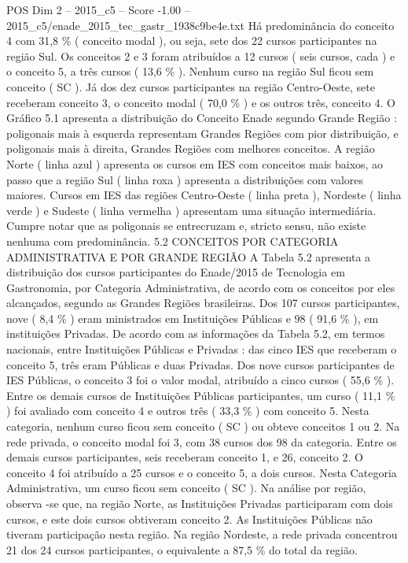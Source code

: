 \begin{textsample}{POS Dim 2 – 2015\_c5 – Score -1.00 – 2015\_c5/enade\_2015\_tec\_gastr\_1938c9be4e.txt}
Há predominância do conceito 4 com 31,8 \% ( conceito modal ), ou seja, sete dos 22 cursos participantes na região Sul.
Os conceitos 2 e 3 foram atribuídos a 12 cursos ( seis cursos, cada ) e o conceito 5, a três cursos ( 13,6 \% ).
Nenhum curso na região Sul ficou sem conceito ( SC ).
Já dos dez cursos participantes na região Centro-Oeste, sete receberam conceito 3, o conceito modal ( 70,0 \% ) e os outros três, conceito 4.
O Gráfico 5.1 apresenta a distribuição do Conceito Enade segundo Grande Região : poligonais mais à esquerda representam Grandes Regiões com pior distribuição, e poligonais mais à direita, Grandes Regiões com melhores conceitos.
A região Norte ( linha azul ) apresenta os cursos em IES com conceitos mais baixos, ao passo que a região Sul ( linha roxa ) apresenta a distribuições com valores maiores.
Cursos em IES das regiões Centro-Oeste ( linha preta ), Nordeste ( linha verde ) e Sudeste ( linha vermelha ) apresentam uma situação intermediária.
Cumpre notar que as poligonais se entrecruzam e, stricto sensu, não existe nenhuma com predominância. 5.2 CONCEITOS POR CATEGORIA ADMINISTRATIVA E POR GRANDE REGIÃO A Tabela 5.2 apresenta a distribuição dos cursos participantes do Enade/2015 de Tecnologia em Gastronomia, por Categoria Administrativa, de acordo com os conceitos por eles alcançados, segundo as Grandes Regiões brasileiras.
Dos 107 cursos participantes, nove ( 8,4 \% ) eram ministrados em Instituições Públicas e 98 ( 91,6 \% ), em instituições Privadas.
De acordo com as informações da Tabela 5.2, em termos nacionais, entre Instituições Públicas e Privadas : das cinco IES que receberam o conceito 5, três eram Públicas e duas Privadas.
Dos nove cursos participantes de IES Públicas, o conceito 3 foi o valor modal, atribuído a cinco cursos ( 55,6 \% ).
Entre os demais cursos de Instituições Públicas participantes, um curso ( 11,1 \% ) foi avaliado com conceito 4 e outros três ( 33,3 \% ) com conceito 5.
Nesta categoria, nenhum curso ficou sem conceito ( SC ) ou obteve conceitos 1 ou 2.
Na rede privada, o conceito modal foi 3, com 38 cursos dos 98 da categoria.
Entre os demais cursos participantes, seis receberam conceito 1, e 26, conceito 2.
O conceito 4 foi atribuído a 25 cursos e o conceito 5, a dois cursos.
Nesta Categoria Administrativa, um curso ficou sem conceito ( SC ).
Na análise por região, observa -se que, na região Norte, as Instituições Privadas participaram com dois cursos, e este dois cursos obtiveram conceito 2.
As Instituições Públicas não tiveram participação nesta região.
Na região Nordeste, a rede privada concentrou 21 dos 24 cursos participantes, o equivalente a 87,5 \% do total da região.

\end{textsample}
